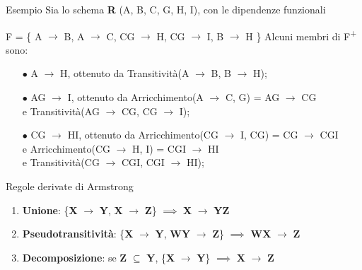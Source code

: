 \documentclass{beamer}
\begin{document}
    

\begin{frame}{Esempio}
    Sia lo schema \textbf{R} (A, B, C, G, H, I), con le dipendenze funzionali\par
    F = 
    \{
        A $\rightarrow$ B,
        A $\rightarrow$ C,
        CG $\rightarrow$ H,
        CG $\rightarrow$ I,
        B $\rightarrow$ H
    \}
    Alcuni membri di F\textsuperscript{+} sono:
    \begin{itemize}
        \item[$\bullet$] A $\rightarrow$ H, ottenuto da Transitività(A $\rightarrow$ B, B $\rightarrow$ H);
        \item[$\bullet$] AG $\rightarrow$ I, ottenuto da Arricchimento(A $\rightarrow$ C, G) = AG $\rightarrow$ CG
        \\ \hspace{3cm} e Transitività(AG $\rightarrow$ CG, CG $\rightarrow$ I);
        \item[$\bullet$] CG $\rightarrow$ HI, ottenuto da Arricchimento(CG $\rightarrow$ I, CG) = CG $\rightarrow$ CGI
        \\ \hspace{3cm} e Arricchimento(CG $\rightarrow$ H, I) = CGI $\rightarrow$ HI
        \\ \hspace{3cm} e Transitività(CG $\rightarrow$ CGI, CGI $\rightarrow$ HI);
    \end{itemize}
\end{frame}

\begin{frame}{Regole derivate di Armstrong}
    \begin{enumerate}
    \item \textbf{Unione}: \{\textbf{X} $\rightarrow$ \textbf{Y}, \textbf{X} $\rightarrow$ \textbf{Z}\} $\implies$ \textbf{X} $\rightarrow$ \textbf{YZ}
    \item \textbf{Pseudotransitività}: \{\textbf{X} $\rightarrow$ \textbf{Y}, \textbf{WY} $\rightarrow$ \textbf{Z}\} $\implies$ \textbf{WX} $\rightarrow$ \textbf{Z}
    \item \textbf{Decomposizione}: se \textbf{Z} $\subseteq$ \textbf{Y}, \{\textbf{X} $\rightarrow$ \textbf{Y}\} $\implies$ \textbf{X} $\rightarrow$ \textbf{Z}
    \end{enumerate}
\end{frame}
\end{document}
